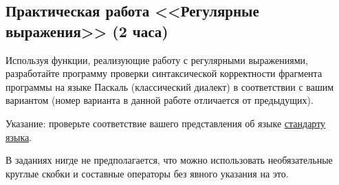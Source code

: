 \subsection{Практическая работа <<Регулярные выражения>> (2 часа)}

Используя функции, реализующие работу с регулярными выражениями, разработайте программу проверки синтаксической
корректности фрагмента программы на языке Паскаль (классический диалект) в 
соответствии с вашим вариантом (номер варианта в данной работе отличается от предыдущих). 

Указание: проверьте соответствие вашего представления об языке \href{https://www.cs.utexas.edu/users/novak/iso7185.pdf}{стандарту языка}.

В заданиях нигде не предполагается, что можно использовать необязательные круглые скобки и составные операторы без явного указания на это.

